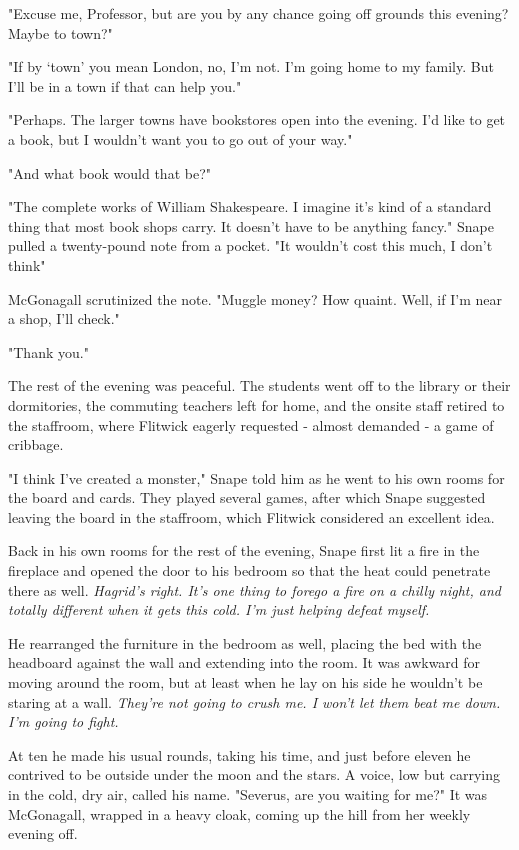 "Excuse me, Professor, but are you by any chance going off grounds this evening? Maybe to town?"

"If by `town' you mean London, no, I'm not. I'm going home to my family. But I'll be in a town if that can help you."

"Perhaps. The larger towns have bookstores open into the evening. I'd like to get a book, but I wouldn't want you to go out of your way."

"And what book would that be?"

"The complete works of William Shakespeare. I imagine it's kind of a standard thing that most book shops carry. It doesn't have to be anything fancy." Snape pulled a twenty-pound note from a pocket. "It wouldn't cost this much, I don't think"

McGonagall scrutinized the note. "Muggle money? How quaint. Well, if I'm near a shop, I'll check."

"Thank you."

The rest of the evening was peaceful. The students went off to the library or their dormitories, the commuting teachers left for home, and the onsite staff retired to the staffroom, where Flitwick eagerly requested - almost demanded - a game of cribbage.

"I think I've created a monster," Snape told him as he went to his own rooms for the board and cards. They played several games, after which Snape suggested leaving the board in the staffroom, which Flitwick considered an excellent idea.

Back in his own rooms for the rest of the evening, Snape first lit a fire in the fireplace and opened the door to his bedroom so that the heat could penetrate there as well. \emph{Hagrid's right. It's one thing to forego a fire on a chilly night, and totally different when it gets this cold. I'm just helping defeat myself.}

He rearranged the furniture in the bedroom as well, placing the bed with the headboard against the wall and extending into the room. It was awkward for moving around the room, but at least when he lay on his side he wouldn't be staring at a wall. \emph{They're not going to crush me. I won't let them beat me down. I'm going to fight.}

At ten he made his usual rounds, taking his time, and just before eleven he contrived to be outside under the moon and the stars. A voice, low but carrying in the cold, dry air, called his name. "Severus, are you waiting for me?" It was McGonagall, wrapped in a heavy cloak, coming up the hill from her weekly evening off.

